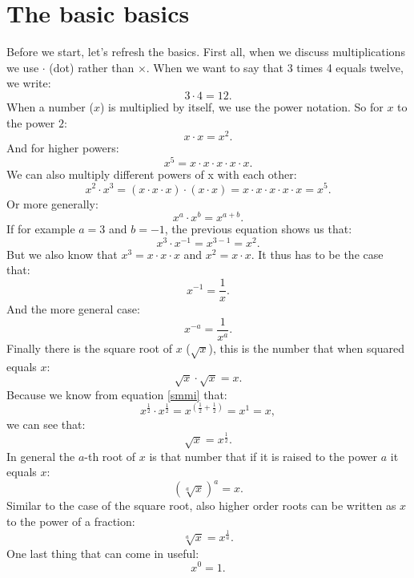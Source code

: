 \documentclass[a4paper]{report}
\begin{document}
\section{The basic basics}
Before we start, let's refresh the basics. First all, when we discuss multiplications we use $\cdot$ (dot) rather than $\times$. When we want to say that 3 times 4 equals twelve, we write:
\begin{equation}
3\cdot 4 = 12.
\end{equation}
When a number ($x$) is multiplied by itself, we use the power notation. So for $x$ to the power $2$:
\begin{equation}
x\cdot x = x^2.
\end{equation}
And for higher powers:
\begin{equation}
x^5 = x\cdot x\cdot x\cdot x\cdot x.
\end{equation}
We can also multiply different powers of x with each other:
\begin{equation}
x^2 \cdot x^3 = \left( x\cdot x\cdot x \right)\cdot \left( x\cdot x \right) = x\cdot x\cdot x\cdot x\cdot x = x^5.
\end{equation}
Or more generally:
\begin{equation}
x^a \cdot x^b = x^{a+b}.
\label{smmi}
\end{equation}
If for example $a=3$ and $b=-1$, the previous equation shows us that:
\begin{equation}
x^3 \cdot x^{-1} = x^{3-1} = x^2.
\end{equation}
But we also know that $x^3 = x \cdot x\cdot x$ and $x^2 = x\cdot x$. It thus has to be the case that:
\begin{equation}
x^{-1} = \frac{1}{x}.
\end{equation}
And the more general case:
\begin{equation}
x^{-a} = \frac{1}{x^a}.
\end{equation}
Finally there is the square root of $x$ ($\sqrt{x}$), this is the number that when squared equals $x$:
\begin{equation}
\sqrt{x} \cdot \sqrt{x} = x.
\end{equation}
Because we know from equation \ref{smmi} that:
\begin{equation}
x^{\frac{1}{2}} \cdot x^{\frac{1}{2}} = x^{(\frac{1}{2} + \frac{1}{2})} = x^1 = x,
\end{equation}
we can see that:
\begin{equation}
\sqrt{x} = x^{\frac{1}{2}}.
\end{equation}
In general the $a$-th root of $x$ is that number that if it is raised to the power $a$ it equals $x$:
\begin{equation}
\left( \sqrt[a]{x}\right)^a = x.
\end{equation}
Similar to the case of the square root, also higher order roots can be written as $x$ to the power of a fraction:
\begin{equation}
\sqrt[a]{x} = x^{\frac{1}{a}}.
\end{equation}
One last thing that can come in useful:
\begin{equation}
x^0=1.
\end{equation}
\end{document}
